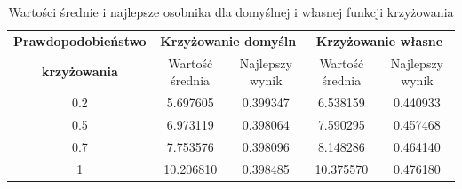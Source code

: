 \begin{table}[!h]
	\centering
	\caption{Wartości średnie i najlepsze osobnika dla domyślnej i własnej funkcji krzyżowania}
	\label{cross_porownanie}
	\hspace*{-0.5in}
	\begin{tabular}{|c|c|c|c|c|}
		\hline
		\textbf{Prawdopodobieństwo} & \multicolumn{2}{c}{\textbf{Krzyżowanie domyśln}}  & \multicolumn{2}{|c|}{\textbf{Krzyżowanie własne}} \\ \cline{2-5}
		\textbf{krzyżowania} & Wartość średnia & Najlepszy wynik & Wartość średnia & Najlepszy wynik \\ \hline
		
		0.2 & 5.697605 & 0.399347 & 6.538159 & 0.440933 \\
		0.5 & 6.973119 & 0.398064 & 7.590295 & 0.457468 \\
		0.7 & 7.753576 & 0.398096 & 8.148286 & 0.464140 \\
		1   & 10.206810 & 0.398485 & 10.375570 & 0.476180  \\ \hline      
	\end{tabular}
\end{table}